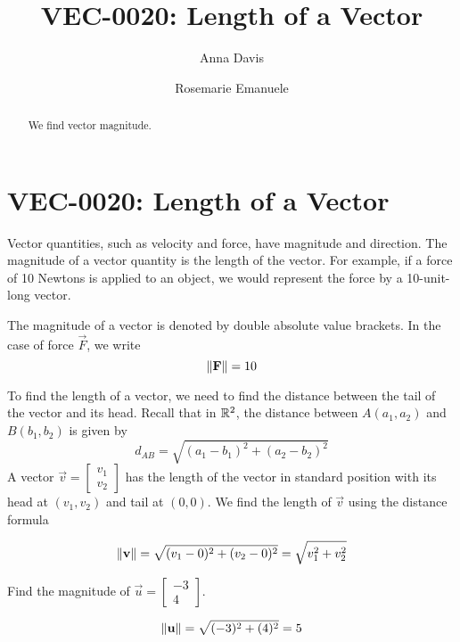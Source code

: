 \documentclass{ximera}
\author{Anna Davis \and Rosemarie Emanuele} \title{VEC-0020:  Length of a Vector} \license{CC-BY 4.0}
\begin{document}
\begin{abstract}
 We find vector magnitude.
\end{abstract}
\maketitle

\section*{VEC-0020:  Length of a Vector}

Vector quantities, such as velocity and force, have magnitude and direction.  The magnitude of a vector quantity is the length of the vector.  For example, if a force of 10 Newtons is applied to an object, we would represent the force by a 10-unit-long vector.

 \begin{image}[2in]
\end{image}

The magnitude of a vector is denoted by double absolute value brackets.  In the case of force $\vec{F}$, we write $$\left\lVert\mathbf{F}\right\rVert=10$$

To find the length of a vector, we need to find the distance between the tail of the vector and its head.  Recall that in $\mathbb{R}^2$, the distance between $A(a_1, a_2)$ and $B(b_1, b_2)$ is given by 
\begin{equation*}
d_{AB}=\sqrt{(a_1-b_1)^2+(a_2-b_2)^2}
\end{equation*}
A vector $\vec{v}=\begin{bmatrix}v_1\\ v_2\end{bmatrix}$ has the length of  the vector in standard position with its head at $(v_1, v_2)$ and tail at $(0, 0)$. We find the length of $\vec{v}$ using the distance formula

\begin{equation}\label{eq:normr2}
\left\lVert\mathbf{v}\right\rVert=\sqrt{(v_1-0)^2+(v_2-0)^2}=\sqrt{v_1^2+v_2^2}
\end{equation}

\begin{example}\label{ex:findmaginr2} Find the magnitude of $\vec{u}=\begin{bmatrix}-3\\4\end{bmatrix}$.  
\begin{image}[1.8in]
\end{image}
\begin{explanation}

 $$
\left\lVert\mathbf{u}\right\rVert=\sqrt{(-3)^2+(4)^2}=5
$$
\end{explanation}
\end{example}
\end{document}
